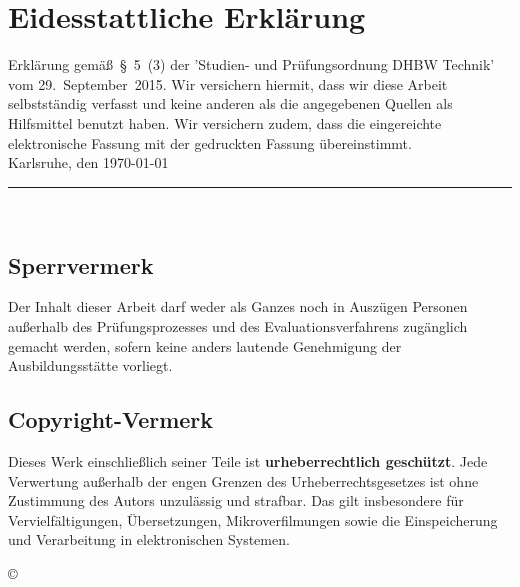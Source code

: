 
\chapter*{Eidesstattliche Erklärung}

Erklärung gemäß~§~5~(3) der 'Studien- und Prüfungsordnung DHBW Technik' vom 29.~September~2015. 
Wir versichern hiermit, dass wir diese Arbeit selbstständig verfasst und keine anderen als die angegebenen Quellen als Hilfsmittel benutzt haben. 
Wir versichern zudem, dass die eingereichte elektronische Fassung mit der gedruckten Fassung übereinstimmt.
\\[4ex]

\noindent Karlsruhe, den \today 
\\[8ex]
\noindent \rule{12cm}{0.5pt} 
\\
\noindent \theAuthor

\section*{Sperrvermerk}
Der Inhalt dieser Arbeit darf weder als Ganzes noch in Auszügen Personen außerhalb des Prüfungsprozesses und des Evaluationsverfahrens zugänglich gemacht werden, sofern keine anders lautende Genehmigung der Ausbildungsstätte vorliegt.

\section*{Copyright-Vermerk}
Dieses Werk einschließlich seiner Teile ist \textbf{urheberrechtlich geschützt}. 
Jede Verwertung außerhalb der engen Grenzen des Urheberrechtsgesetzes ist ohne Zustimmung des Autors unzulässig und strafbar. 
Das gilt insbesondere für Vervielfältigungen, Übersetzungen, Mikroverfilmungen sowie die Einspeicherung und Verarbeitung in elektronischen Systemen.

\begin{flushright}
    \copyright{}
\end{flushright}